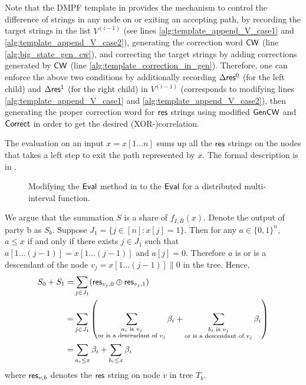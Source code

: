 Note that the DMPF template in  provides the mechanism to control the difference of strings in any node on or exiting an accepting path, by recording the target strings in the list $V^{(i-1)}$ (see lines \ref{alg:template_append_V_case1} and \ref{alg:template_append_V_case2}), generating the correction word ${\sf CW}$ (line \ref{alg:big_state_gen_cw}), and correcting the target strings by adding corrections generated by ${\sf CW}$ (line \ref{alg:template_correction_in_gen}). Therefore, one can enforce the above two conditions by additionally recording $\Delta{\sf res}^0$ (for the left child) and $\Delta {\sf res}^1$ (for the right child) in $V^{(i-1)}$ (corresponds to modifying lines \ref{alg:template_append_V_case1} and \ref{alg:template_append_V_case2}), then generating the proper correction word for ${\sf res}$ strings using  modified ${\sf Gen}{\sf CW}$ and ${\sf Correct}$ in order to get the desired (XOR-)correlation. 

The evaluation on an input $x = x[1\dots n]$ sums up all the ${\sf res}$ strings on the nodes that takes a left step to exit the path represented by $x$. The formal description is in . 
\begin{figure}
  \caption{Modifying the ${\sf Eval}$ method in  to the ${\sf Eval}$ for a distributed multi-interval function. }
  \label{fig:multi-interval_eval}
\end{figure}
We argue that the summation $S$ is a share of $f_{I,B}(x)$. Denote the output of party b as $S_b$. Suppose $J_1 = \{j\in[n]:x[j]=1\}$. Then for any $a\in \{0,1\}^n$, $a\le x$ if and only if there exists $j\in J_1$ such that $a[1\dots(j-1)] = x[1\dots (j-1)]$ and $a[j] = 0$. Therefore $a$ is or is a descendant of the node $v_j = x[1\dots (j-1)]\|0$ in the tree. Hence, 
\[
  \begin{split}
    S_0 + S_1 =& \sum_{j\in J_1} ({\sf res}_{v_j, 0}\oplus{\sf res}_{v_j,1})\\
    =& \sum_{j\in J_1} \left(\sum_{\substack{a_i\text{ is }v_j\\\text{or is a descendant of }v_j}}\beta_i +\sum_{\substack{b_i\text{ is }v_j\\\text{or is a descendant of }v_j}}\beta_i\right)\\
    =&\sum_{a_i\le x}\beta_i + \sum_{b_i\le x}\beta_i
  \end{split}
\]
where ${\sf res}_{v,b}$ denotes the ${\sf res}$ string on node $v$ in tree $T_b$. 

